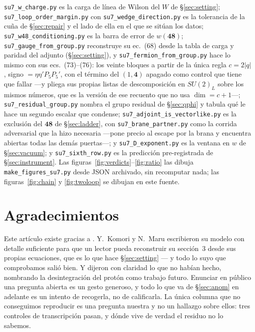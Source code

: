 \documentclass[11pt,a4paper]{article}
\newcommand{\su}[1]{SU(#1)}
\newcommand{\rep}[1]{\mathbf{#1}}
\begin{document}
\texttt{su7\_\allowbreak w\_\allowbreak charge.py} es la carga de línea de Wilson del $W$ de
\S\ref{sec:setting}; \texttt{su7\_\allowbreak loop\_\allowbreak order\_\allowbreak margin.py} con
\texttt{su7\_\allowbreak wedge\_\allowbreak direction.py} es la tolerancia de la cuña de \S\ref{sec:repair} y el
lado de ella en el que se sitúan los datos; \texttt{su7\_\allowbreak w48\_\allowbreak conditioning.py} es la barra
de error de $w(\rep{48})$; \texttt{su7\_\allowbreak gauge\_\allowbreak from\_\allowbreak group.py} reconstruye su
ec.~(68) desde la tabla de carga y paridad del adjunto (\S\ref{sec:setting}), y
\texttt{su7\_\allowbreak fermion\_\allowbreak from\_\allowbreak group.py} hace lo mismo con sus
ecs.~(73)--(76): los veinte bloques a partir de la única regla $c=2|q|$, signo $=\eta\eta'P_5P_5'$,
con el término del $(1,\rep4)$ apagado como control que tiene que fallar ---y pliega sus propias
listas de descomposición en $\su2_L$ sobre los mismos números, que es la versión de ese recuento que
no usa $\dim=c+1$---;
\texttt{su7\_\allowbreak residual\_\allowbreak group.py} nombra el grupo residual de \S\ref{sec:qphi} y
tabula qué le hace un segundo escalar que condense;
\texttt{su7\_\allowbreak adjoint\_\allowbreak is\_\allowbreak vectorlike.py} es la exclusión del
$\rep{48}$ de \S\ref{sec:ladder}, con \texttt{su7\_\allowbreak brane\_\allowbreak partner.py} como la
corrida adversarial que la hizo necesaria ---pone precio al escape por la brana y encuentra abiertas
todas las demás puertas---; y
\texttt{su7\_\allowbreak D\_\allowbreak exponent.py} es la ventana en $w$ de \S\ref{sec:vacuum}; y
\texttt{su7\_\allowbreak sixth\_\allowbreak row.py} es la predicción pre-registrada de \S\ref{sec:instrument}.
Las figuras~\ref{fig:verdicts}--\ref{fig:ratio} las dibuja \texttt{make\_\allowbreak figures\_\allowbreak su7.py}
desde JSON archivado, sin recomputar nada; las figuras~\ref{fig:chain} y \ref{fig:twoloop} se dibujan
en este fuente.
\par\endgroup
\fussy

\section*{Agradecimientos}

Este artículo existe gracias a \cite{KM25}. Y.~Komori y N.~Maru escribieron su modelo con detalle
suficiente para que un lector pueda reconstruir su sección~3 desde sus propias ecuaciones, que es lo
que hace \S\ref{sec:setting} --- y todo lo suyo que comprobamos salió bien. Y dijeron con claridad lo
que no habían hecho, nombrando la desintegración del protón como trabajo futuro. Enunciar en público
una pregunta abierta es un gesto generoso, y todo lo que va de \S\ref{sec:anom} en adelante es un
intento de recogerla, no de calificarla. La única columna que no conseguimos reproducir es una
pregunta nuestra y no un hallazgo sobre ellos: tres controles de transcripción pasan, y dónde vive de
verdad el residuo no lo sabemos.
\end{document}
